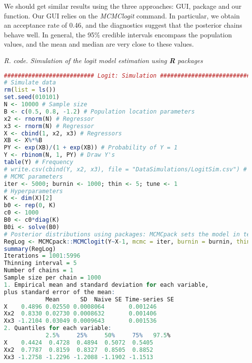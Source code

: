 We should get similar results using the three approaches: GUI, package and our function. Our GUI relies on the \textit{MCMClogit} command. In particular, we obtain an acceptance rate of 0.46, and the diagnostics suggest that the posterior chains behave well. In general, the 95\% credible intervals encompass the population values, and the mean and median are very close to these values.  

\begin{tcolorbox}[enhanced,width=4.67in,center upper,
	fontupper=\large\bfseries,drop shadow southwest,sharp corners]
	\textit{R. code. Simulation of the logit model estimation using \textbf{R} packages}
	\begin{VF}
		\begin{lstlisting}[language=R]		
########################## Logit: Simulation ##########################
# Simulate data
rm(list = ls())
set.seed(010101)
N <- 10000 # Sample size
B <- c(0.5, 0.8, -1.2) # Population location parameters
x2 <- rnorm(N) # Regressor
x3 <- rnorm(N) # Regressor
X <- cbind(1, x2, x3) # Regressors
XB <- X%*%B
PY <- exp(XB)/(1 + exp(XB)) # Probability of Y = 1
Y <- rbinom(N, 1, PY) # Draw Y's
table(Y) # Frequency
# write.csv(cbind(Y, x2, x3), file = "DataSimulations/LogitSim.csv") # Export data
# MCMC parameters
iter <- 5000; burnin <- 1000; thin <- 5; tune <- 1
# Hyperparameters
K <- dim(X)[2] 
b0 <- rep(0, K)
c0 <- 1000
B0 <- c0*diag(K)
B0i <- solve(B0)
# Posterior distributions using packages: MCMCpack sets the model in terms of the precision matrix
RegLog <- MCMCpack::MCMClogit(Y~X-1, mcmc = iter, burnin = burnin, thin = thin, b0 = b0, B0 = B0i, tune = tune)
summary(RegLog)
Iterations = 1001:5996
Thinning interval = 5 
Number of chains = 1 
Sample size per chain = 1000 
1. Empirical mean and standard deviation for each variable,
plus standard error of the mean:
			Mean      SD  Naive SE Time-series SE
X    0.4896 0.02550 0.0008064       0.001246
Xx2  0.8330 0.02730 0.0008632       0.001406
Xx3 -1.2104 0.03049 0.0009643       0.001536
2. Quantiles for each variable:
			2.5%     25%     50%     75%   97.5%
X    0.4424  0.4728  0.4894  0.5072  0.5405
Xx2  0.7787  0.8159  0.8327  0.8505  0.8852
Xx3 -1.2758 -1.2296 -1.2088 -1.1902 -1.1513
\end{lstlisting}
	\end{VF}
\end{tcolorbox} 

